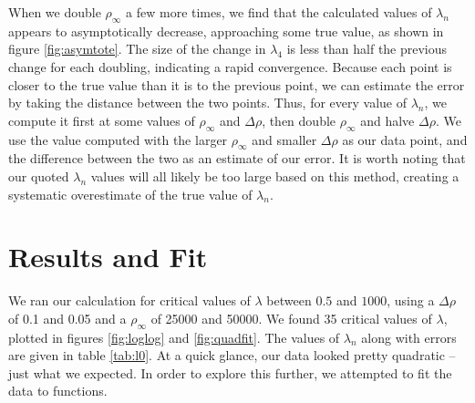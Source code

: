 \documentclass[12pt,twoside]{reedthesis}
\begin{document}
When we double $\rho_{\infty}$ a few more times, we find that the calculated values of $\lambda_{n}$ appears to asymptotically decrease, approaching some true value, as shown in figure \ref{fig:asymtote}. The size of the change in $\lambda_4$ is less than half the previous change for each doubling, indicating a rapid convergence. Because each point is closer to the true value than it is to the previous point, we can estimate the error by taking the distance between the two points. Thus, for every value of $\lambda_n$, we compute it first at some values of $\rho_{\infty}$ and $\Delta \rho$, then double $\rho_{\infty}$ and halve $\Delta \rho$. We use the value computed with the larger $\rho_{\infty}$ and smaller $\Delta \rho$ as our data point, and the difference between the two as an estimate of our error.  It is worth noting that our quoted $\lambda_n$ values will all likely be too large based on this method, creating a systematic overestimate of the true value of $\lambda_n$.
 
\section{Results and Fit}
We ran our calculation for critical values of $\lambda$ between $0.5$ and $1000$, using a $\Delta \rho$ of 0.1 and 0.05 and a $\rho_{\infty}$ of 25000 and 50000. We found 35 critical values of $\lambda$, plotted in figures \ref{fig:loglog} and \ref{fig:quadfit}. The values of $\lambda_n$ along with errors are given in table \ref{tab:l0}. At a quick glance, our data looked pretty quadratic -- just what we expected. In order to explore this further, we attempted to fit the data to functions.
\end{document}
